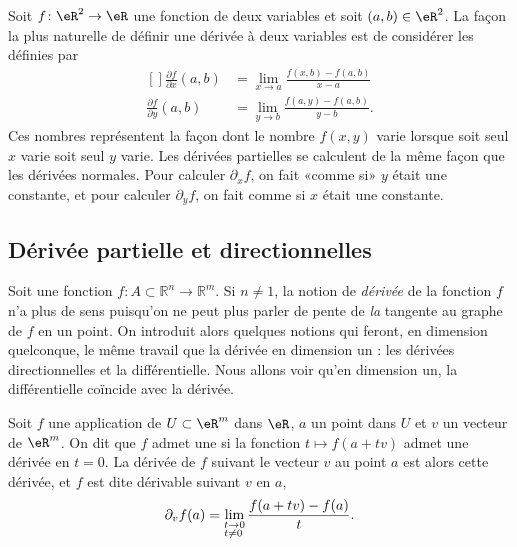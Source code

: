Soit $f\colon \eR^2\to \eR$ une fonction de deux variables et soit $(a,b)\in\eR^2$. La façon la plus naturelle de définir une dérivée à deux variables est de considérer les  définies par
\begin{equation}
    \begin{aligned}[]
        \frac{ \partial f }{ \partial x }(a,b)&=\lim_{x\to a} \frac{ f(x,b)-f(a,b) }{ x-a }\\
        \frac{ \partial f }{ \partial y }(a,b)&=\lim_{y\to b} \frac{ f(a,y)-f(a,b) }{y-b}.
    \end{aligned}
\end{equation}
Ces nombres représentent la façon dont le nombre $f(x,y)$ varie lorsque soit seul $x$ varie soit seul $y$ varie. Les dérivées partielles se calculent de la même façon que les dérivées normales. Pour calculer $\partial_xf$, on fait «comme si» $y$ était une constante, et pour calculer $\partial_yf$, on fait comme si $x$ était une constante.

                    \subsection{Dérivée partielle et directionnelles}

Soit une fonction $f:A\subset \mathbb{R}^n \rightarrow \mathbb{R}^m$. Si $n\neq 1$, la notion de \emph{dérivée} de la fonction $f$ n'a plus de sens puisqu'on ne peut plus parler de pente de \emph{la} tangente au graphe de $f$ en un point. On introduit alors quelques notions qui feront, en dimension quelconque, le même travail que la dérivée en dimension un : les dérivées directionnelles et la différentielle. Nous allons voir qu'en dimension un, la différentielle coïncide avec la dérivée.

\begin{definition}
Soit $f$ une application de $U\subset\eR^m$ dans $\eR$, $a$ un point dans $U$ et $v$ un vecteur de $\eR^m$. On dit que $f$ admet une  si la fonction $t\mapsto f(a+tv)$ admet une dérivée en $t=0$. La  dérivée de $f$ suivant le vecteur $v$ au point $a$ est alors cette dérivée, et $f$ est dite dérivable suivant $v$ en $a$,
\[
\partial_v f(a)=\lim_{
  \begin{subarray}{l}
    t\to 0\\ t\neq 0
  \end{subarray}
 }\frac{f(a+tv)-f(a)}{t}.
\]
\end{definition}

